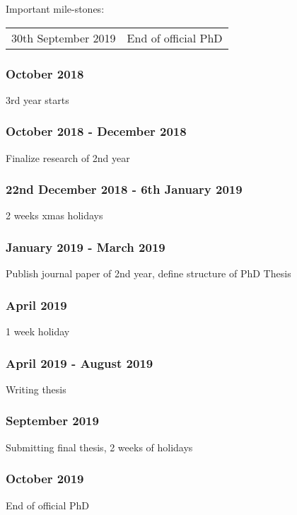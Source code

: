 Important mile-stones:

\begin{center}
\begin{tabular}{ c|c } 
	30th September 2019 & End of official PhD \\ 
\end{tabular}
\end{center}

\subsubsection{October 2018}
3rd year starts

\subsubsection{October 2018 - December 2018}
Finalize research of 2nd year

\subsubsection{22nd December 2018 - 6th January 2019}
2 weeks xmas holidays

\subsubsection{January 2019 - March 2019}
Publish journal paper of 2nd year, define structure of PhD Thesis

\subsubsection{April 2019}
1 week holiday

\subsubsection{April 2019 - August 2019}
Writing thesis
	
\subsubsection{September 2019}
Submitting final thesis, 2 weeks of holidays

\subsubsection{October 2019}
End of official PhD










